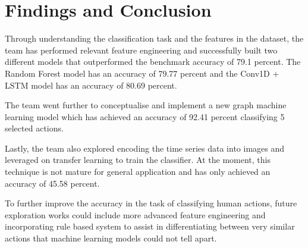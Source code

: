 \documentclass[conference]{IEEEtran}
\begin{document}
\section{Findings and Conclusion}

Through understanding the classification task and the features in the dataset, the team has performed relevant feature engineering and successfully built two different models that outperformed the benchmark accuracy of 79.1 percent. The Random Forest model has an accuracy of 79.77 percent and the Conv1D + LSTM model has an accuracy of 80.69 percent.

The team went further to conceptualise and implement a new graph machine learning model which has achieved an accuracy of 92.41 percent classifying 5 selected actions. 

Lastly, the team also explored encoding the time series data into images and leveraged on transfer learning to train the classifier. At the moment, this technique is not mature for general application and has only achieved an accuracy of 45.58 percent.

To further improve the accuracy in the task of classifying human actions, future exploration works could include more advanced feature engineering and incorporating rule based system to assist in differentiating between very similar actions that machine learning models could not tell apart.



\end{document}
